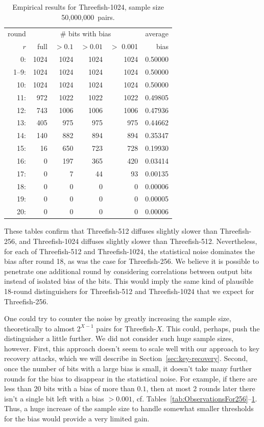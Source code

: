 \documentclass[11pt,twoside]{article}
\begin{document}
\begin{table}[tbh]
  \centering
\begin{tabular}{|r|rrrr|r|}
\hline
round & \multicolumn{ 4}{c|}{\# bits with bias} & average\\
$r$ & \quad full & $>0.1$ & $>0.01$ & $>$ 0.001 & bias \\  \hline
 0: &  1024 &  1024 &  1024 &  1024 & 0.50000  \\
 1--9: &  1024 &  1024 &  1024 &  1024 & 0.50000  \\
 10: &  1024 &  1024 &  1024 &  1024 & 0.50000  \\
 11: &  972 &  1022 &  1022 &  1022 & 0.49805  \\
 12: &  743 &  1006 &  1006 &  1006 & 0.47936  \\
 13: &  405 &  975 &  975 &  975 & 0.44662  \\
 14: &  140 &  882 &  894 &  894 & 0.35347  \\
 15: &  16 &  650 &  723 &  728 & 0.19930  \\
 16: &  0 &  197 &  365 &  420 & 0.03414  \\
 17: &  0 &  7 &  44 &  93 & 0.00135  \\
 18: &  0 &  0 &  0 &  0 & 0.00006  \\
 19: &  0 &  0 &  0 &  0 & 0.00005  \\
 20: &  0 &  0 &  0 &  0 & 0.00006  \\
\hline
\end{tabular}
\caption{Empirical results for Threefish-1024, sample size 50,000,000~pairs.}
\label{tab:ObservationsFor1024}
\end{table}

These tables confirm that Threefish-512 diffuses slightly slower than Threefish-256, and Threefish-1024 diffuses slightly slower than Threefish-512. Nevertheless, for each of Threefish-512 and Threefish-1024, the statistical noise dominates the bias after round 18, as was the case for Threefish-256. We believe it is possible to penetrate one additional round by considering correlations between output bits instead of isolated bias of the bits. This would imply the same kind of plausible 18-round distinguishers for Threefish-512 and Threefish-1024 that we expect for Threefish-256. 

One could try to counter the noise by greatly increasing the sample size, theoretically to almost $2^{X-1}$ pairs for Threefish-$X$. This could, perhaps, push the distinguisher a little further. We did not consider such huge sample sizes, however. First, this approach doesn't seem to scale well with our approach to key recovery attacks, which we will describe in Section~\ref{sec:key-recovery}. Second, once the number of bits with a large bias is small, it doesn't take many further rounds for the bias to disappear in the statistical noise. For example, if there are less than 20 bits with a bias of more than $0.1$, then at most 2 rounds later there isn't a single bit left with a bias $>0.001$, cf. Tables~\ref{tab:ObservationsFor256}--\ref{tab:ObservationsFor1024}. Thus, a huge increase of the sample size to handle somewhat smaller thresholds for the bias would provide a very limited gain.
\end{document}
